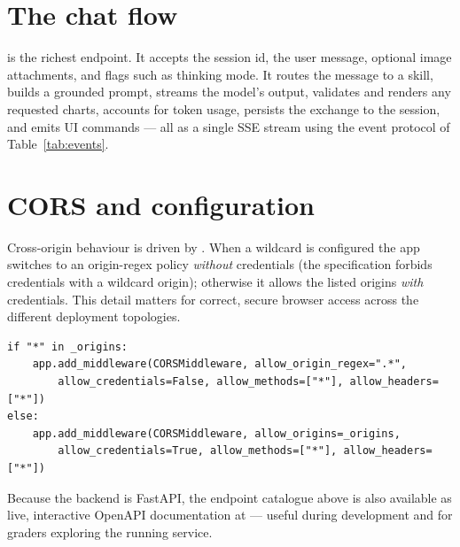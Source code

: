 \section{The chat flow}
 is the richest endpoint. It accepts the session id, the user
message, optional image attachments, and flags such as thinking mode. It routes
the message to a skill, builds a grounded prompt, streams the model's output,
validates and renders any requested charts, accounts for token usage, persists
the exchange to the session, and emits UI commands --- all as a single SSE
stream using the event protocol of Table~\ref{tab:events}.

\section{CORS and configuration}
Cross-origin behaviour is driven by . When a wildcard is
configured the app switches to an origin-regex policy \emph{without} credentials
(the specification forbids credentials with a wildcard origin); otherwise it
allows the listed origins \emph{with} credentials. This detail matters for
correct, secure browser access across the different deployment topologies.

\begin{lstlisting}[style=py,caption={Credential-safe CORS handling in \code{main.py}.}]
if "*" in _origins:
    app.add_middleware(CORSMiddleware, allow_origin_regex=".*",
        allow_credentials=False, allow_methods=["*"], allow_headers=["*"])
else:
    app.add_middleware(CORSMiddleware, allow_origins=_origins,
        allow_credentials=True, allow_methods=["*"], allow_headers=["*"])
\end{lstlisting}

\begin{uanote}
Because the backend is FastAPI, the endpoint catalogue above is also available
as live, interactive OpenAPI documentation at  --- useful during
development and for graders exploring the running service.
\end{uanote}
